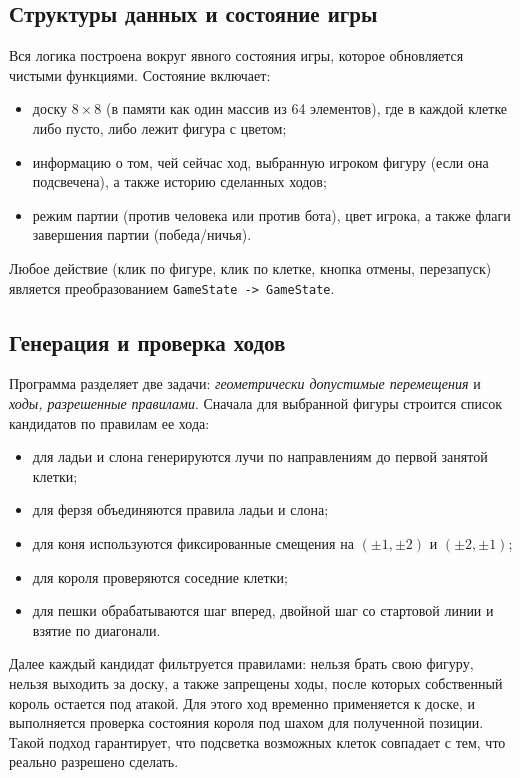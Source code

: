 \subsection{Структуры данных и состояние игры}
Вся логика построена вокруг явного состояния игры, которое обновляется чистыми функциями. Состояние включает:
\begin{itemize}
    \item доску $8\times 8$ (в памяти как один массив из 64 элементов), где в каждой клетке либо пусто, либо лежит фигура с цветом;
    \item информацию о том, чей сейчас ход, выбранную игроком фигуру (если она подсвечена), а также историю сделанных ходов;
    \item режим партии (против человека или против бота), цвет игрока, а также флаги завершения партии (победа/ничья).
\end{itemize}
Любое действие (клик по фигуре, клик по клетке, кнопка отмены, перезапуск) является преобразованием \texttt{GameState -> GameState}. 
\subsection{Генерация и проверка ходов}
Программа разделяет две задачи: \textit{геометрически допустимые перемещения} и \textit{ходы, разрешенные правилами}.
Сначала для выбранной фигуры строится список кандидатов по правилам ее хода:
\begin{itemize}
    \item для ладьи и слона генерируются лучи по направлениям до первой занятой клетки;
    \item для ферзя объединяются правила ладьи и слона;
    \item для коня используются фиксированные смещения на $(\pm 1,\pm 2)$ и $(\pm 2,\pm 1)$;
    \item для короля проверяются соседние клетки;
    \item для пешки обрабатываются шаг вперед, двойной шаг со стартовой линии и взятие по диагонали.
\end{itemize}
Далее каждый кандидат фильтруется правилами: нельзя брать свою фигуру, нельзя выходить за доску, а также запрещены ходы, после которых собственный король остается под атакой. Для этого ход временно применяется к доске, и выполняется проверка состояния короля под шахом для полученной позиции. Такой подход гарантирует, что подсветка возможных клеток совпадает с тем, что реально разрешено сделать.

